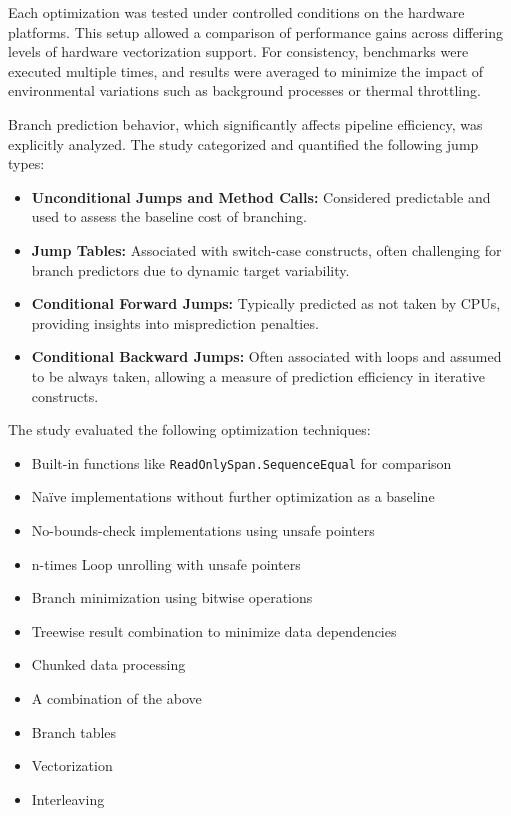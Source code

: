 \documentclass{article}
\begin{document}
Each optimization was tested under controlled conditions on the hardware platforms. This setup allowed a comparison of performance gains across differing levels of hardware vectorization support. For consistency, benchmarks were executed multiple times, and results were averaged to minimize the impact of environmental variations such as background processes or thermal throttling.

Branch prediction behavior, which significantly affects pipeline efficiency, was explicitly analyzed. The study categorized and quantified the following jump types:
\begin{itemize}
    \item \textbf{Unconditional Jumps and Method Calls:} Considered predictable and used to assess the baseline cost of branching.
    \item \textbf{Jump Tables:} Associated with switch-case constructs, often challenging for branch predictors due to dynamic target variability.
    \item \textbf{Conditional Forward Jumps:} Typically predicted as not taken by CPUs, providing insights into misprediction penalties.
    \item \textbf{Conditional Backward Jumps:} Often associated with loops and assumed to be always taken, allowing a measure of prediction efficiency in iterative constructs.
\end{itemize}

The study evaluated the following optimization techniques:
\begin{itemize}
  \item Built-in functions like \texttt{ReadOnlySpan.SequenceEqual} for comparison
  \item Naïve implementations without further optimization as a baseline
  \item No-bounds-check implementations using unsafe pointers
  \item n-times Loop unrolling with unsafe pointers
  \item Branch minimization using bitwise operations
  \item Treewise result combination to minimize data dependencies
  \item Chunked data processing
  \item A combination of the above
  \item Branch tables
  \item Vectorization
  \item Interleaving
\end{itemize}
\end{document}

